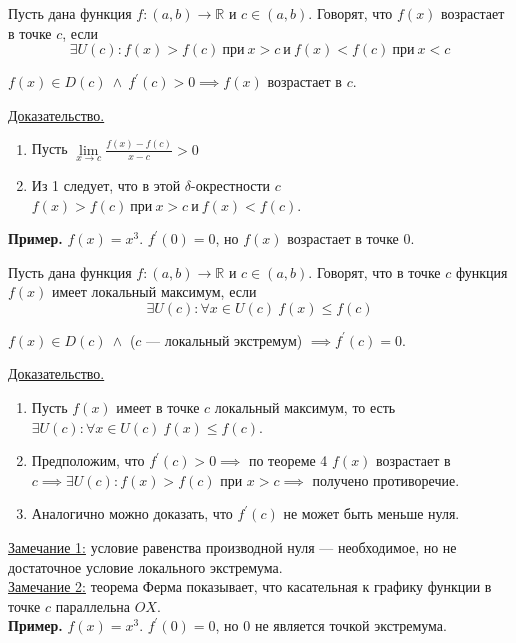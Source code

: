 \documentclass{article}
\begin{document}
\begin{definition}
    Пусть дана функция \(f: (a, b) \to \mathbb{R}\) и \(c \in (a, b)\). Говорят, что \(f(x)\) возрастает в точке \(c\), если
    \[\exists U(c): f(x) > f(c)\ \text{при}\  x > c\ \text{и}\  f(x) < f(c)\ \text{при}\  x < c\]       
\end{definition}

\begin{theorem}
    \(f(x) \in D(c)\ \land\ f^{\prime}(c) > 0 \implies f(x)\) возрастает в \(c\).  
\end{theorem}
\noindent \underline{Доказательство.}
\begin{enumerate}
    \item Пусть \(\displaystyle \lim\limits_{x \to c} \frac{f(x) - f(c)}{x - c} > 0\)
    \item Из 1 следует, что в этой \(\delta\)-окрестности \(c\) \(f(x) > f(c)\ \text{при}\  x > c\ \text{и}\  f(x) < f(c)\). 
\end{enumerate}
\noindent \textbf{Пример.} \(f(x) = x^3\). \(f^{\prime}(0) = 0\), но \(f(x)\) возрастает в точке \(0\).

\begin{definition}
    Пусть дана функция \(f: (a, b) \to \mathbb{R}\) и \(c \in (a, b)\). Говорят, что в точке \(c\) функция \(f(x)\) имеет локальный максимум, если
    \[
        \exists U(c): \forall x \in U(c)\ f(x) \leq f(c)
    \] 
\end{definition}

\begin{lemma}[Ферма]
    \(f(x) \in D(c)\ \land\) (\(c\) --- локальный экстремум) \(\implies f^{\prime}(c) = 0\).  
\end{lemma}
\noindent \underline{Доказательство.}
\begin{enumerate}
    \item Пусть \(f(x)\) имеет в точке \(c\) локальный максимум, то есть \(\exists U(c): \forall x \in U(c)\ f(x) \leq f(c)\).
    \item Предположим, что \(f^{\prime}(c) > 0 \implies\) по теореме 4 \(f(x)\) возрастает в \(c \implies \exists U(c): f(x) > f(c)\) при \(x > c \implies\) получено противоречие.
    \item Аналогично можно доказать, что \(f^{\prime}(c)\) не может быть меньше нуля.     
\end{enumerate}
\noindent \underline{Замечание 1:} условие равенства производной нуля --- необходимое, но не достаточное условие локального экстремума.\\
\underline{Замечание 2:} теорема Ферма показывает, что касательная к графику функции в точке \(c\) параллельна \(OX\).\\[0.15cm]
\textbf{Пример.} \(f(x) = x^3\). \(f^{\prime}(0) = 0\), но \(0\) не является точкой экстремума.\\
\end{document}
